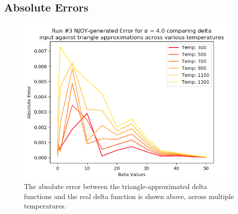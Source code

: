 \documentclass[a4paper]{article}
\begin{document}
\subsection{Absolute Errors}
\begin{figure}[H]
\centering
\includegraphics[width=0.99\textwidth]{run3_temperatures_absolute_error_alpha_equals_4.png}
\caption{\label{fig:run3_abs_error}The absolute error between the triangle-approximated delta functions and the real delta function is shown above, across multiple temperatures. }
\end{figure}
\end{document}
